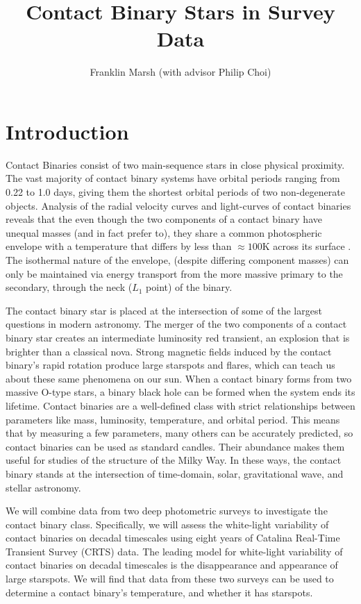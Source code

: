 \documentclass[11pt, oneside]{article}   	%
\title{Contact Binary Stars in Survey Data}
\author{Franklin Marsh (with advisor Philip Choi)}
\begin{document}
\maketitle

\section{Introduction}

Contact Binaries consist of two main-sequence stars in close physical proximity. The vast majority of contact binary systems have orbital periods ranging from 0.22 to 1.0 days, giving them the shortest orbital periods of two non-degenerate objects. Analysis of the radial velocity curves and light-curves of contact binaries reveals that the even though the two components of a contact binary have unequal masses (and in fact prefer to), they share a common photospheric envelope with a temperature that differs by less than $\approx 100$K across its surface \citep{rucinski1993realm}. The isothermal nature of the envelope, (despite differing component masses) can only be maintained via energy transport from the more massive primary to the secondary, through the neck ($L_{1}$ point) of the binary.

The contact binary star is placed at the intersection of some of the largest questions in modern astronomy. The merger of the two components of a contact binary star creates an intermediate luminosity red transient, an explosion that is brighter than a classical nova. Strong magnetic fields induced by the contact binary's rapid rotation produce large starspots and flares, which can teach us about these same phenomena on our sun. When a contact binary forms from two massive O-type stars, a binary black hole can be formed when the system ends its lifetime. Contact binaries are a well-defined class with strict relationships between parameters like mass, luminosity, temperature, and orbital period. This means that by measuring a few parameters, many others can be accurately predicted, so contact binaries can be used as standard candles. Their abundance makes them useful for studies of the structure of the Milky Way. In these ways, the contact binary stands at the intersection of time-domain, solar, gravitational wave, and stellar astronomy.

We will combine data from two deep photometric surveys to investigate the contact binary class. Specifically, we will assess the white-light variability of contact binaries on decadal timescales using eight years of Catalina Real-Time Transient Survey (CRTS) data. The leading model for white-light variability of contact binaries on decadal timescales is the disappearance and appearance of large starspots. We will find that data from these two surveys can be used to determine a contact binary's temperature, and whether it has starspots. 
\end{document}
